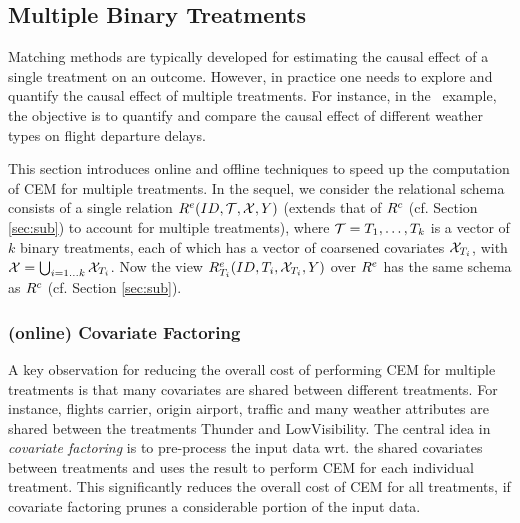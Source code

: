 \vspace{-.1cm}
\subsection{Multiple Binary Treatments}

\label{sec:mte}

Matching methods are typically developed for estimating the causal effect of a single treatment
on an outcome. However, in practice one needs
to explore and quantify the causal effect of multiple treatments.
For instance, in the \delay \ example, the objective is to quantify and compare the causal effect
of different weather types on flight departure delays.

This section introduces online and offline techniques to speed up the computation of  CEM
for multiple treatments.  In the sequel, we consider the relational schema consists of a single relation ${{R}^e}(ID,{{\mathcal{T}}},{{\mathcal{X}}},Y)$ (extends that of ${{R}^c}$ (cf. Section \ref{sec:sub}) to account for multiple treatments), where ${{\mathcal{T}}}=T_1, \ldots, T_k$ is a vector of $k$ binary
treatments, each of which has a vector of coarsened covariates ${{\mathcal{X}}}_{T_i}$, with ${{\mathcal{X}}}= \bigcup_{i=1 \ldots k} {{\mathcal{X}}}_{T_i}$.
Now the view ${{R}^e_{T_i}}(ID,T_i,{{\mathcal{X}}}_{T_i},Y)$ over ${{R}^e}$ has the same schema
as ${{R}^c}$ (cf. Section \ref{sec:sub}). 


\vspace{-.2cm}

\subsubsection{(online) Covariate Factoring}

A key observation for reducing the overall cost of performing CEM for multiple treatments is that
many covariates are shared between different treatments. For instance, flights carrier, origin airport, traffic and many weather attributes are shared between the treatments Thunder and LowVisibility. The central idea in {\em covariate factoring}  is to pre-process the input data
wrt.  the shared covariates between treatments and uses the result to perform CEM
for each individual treatment. This  significantly reduces the overall cost of CEM for all treatments,
if covariate factoring prunes a considerable portion of the input data.


